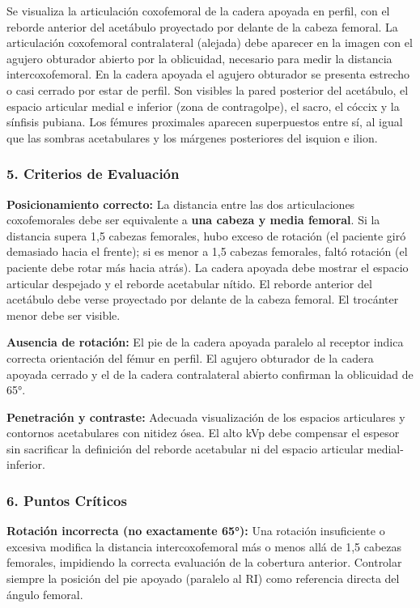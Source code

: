 	Se visualiza la articulación coxofemoral de la cadera apoyada en perfil, con el reborde anterior del acetábulo proyectado por delante de la cabeza femoral. La articulación coxofemoral contralateral (alejada) debe aparecer en la imagen con el agujero obturador abierto por la oblicuidad, necesario para medir la distancia intercoxofemoral. En la cadera apoyada el agujero obturador se presenta estrecho o casi cerrado por estar de perfil. Son visibles la pared posterior del acetábulo, el espacio articular medial e inferior (zona de contragolpe), el sacro, el cóccix y la sínfisis pubiana. Los fémures proximales aparecen superpuestos entre sí, al igual que las sombras acetabulares y los márgenes posteriores del isquion e ilion.
	
	\subsubsection*{5. Criterios de Evaluación}
	
	\textbf{Posicionamiento correcto:} La distancia entre las dos articulaciones coxofemorales debe ser equivalente a \textbf{una cabeza y media femoral}. Si la distancia supera 1,5 cabezas femorales, hubo exceso de rotación (el paciente giró demasiado hacia el frente); si es menor a 1,5 cabezas femorales, faltó rotación (el paciente debe rotar más hacia atrás). La cadera apoyada debe mostrar el espacio articular despejado y el reborde acetabular nítido. El reborde anterior del acetábulo debe verse proyectado por delante de la cabeza femoral. El trocánter menor debe ser visible.
	
	\textbf{Ausencia de rotación:} El pie de la cadera apoyada paralelo al receptor indica correcta orientación del fémur en perfil. El agujero obturador de la cadera apoyada cerrado y el de la cadera contralateral abierto confirman la oblicuidad de 65°.
	
	\textbf{Penetración y contraste:} Adecuada visualización de los espacios articulares y contornos acetabulares con nitidez ósea. El alto kVp debe compensar el espesor sin sacrificar la definición del reborde acetabular ni del espacio articular medial-inferior.
	
	\subsubsection*{6. Puntos Críticos}
	
	\textbf{Rotación incorrecta (no exactamente 65°):} Una rotación insuficiente o excesiva modifica la distancia intercoxofemoral más o menos allá de 1,5 cabezas femorales, impidiendo la correcta evaluación de la cobertura anterior. Controlar siempre la posición del pie apoyado (paralelo al RI) como referencia directa del ángulo femoral.
	

